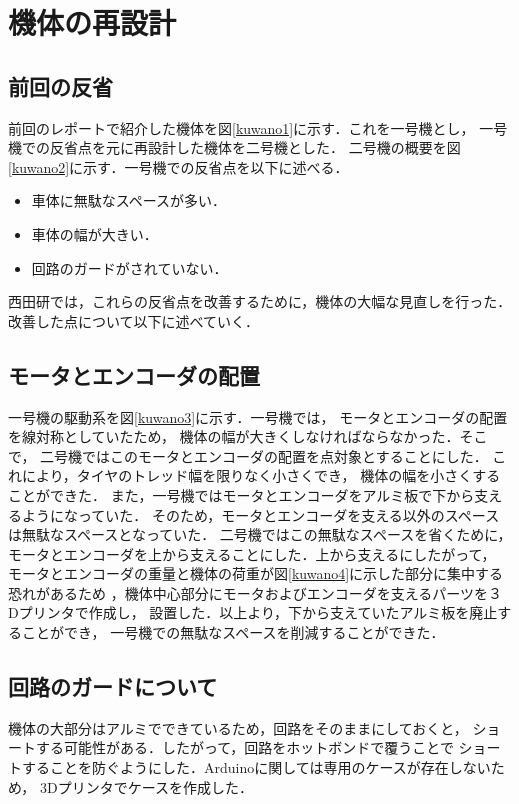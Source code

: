 \documentclass[11pt,a4j]{jarticle}
\begin{document}
\section{機体の再設計}
\subsection{前回の反省}
前回のレポートで紹介した機体を図\ref{kuwano1}に示す．これを一号機とし，
一号機での反省点を元に再設計した機体を二号機とした．
二号機の概要を図\ref{kuwano2}に示す．一号機での反省点を以下に述べる．

\begin{itemize}
 \item 車体に無駄なスペースが多い．
 \item 車体の幅が大きい．
 \item 回路のガードがされていない．
\end{itemize}

西田研では，これらの反省点を改善するために，機体の大幅な見直しを行った．
改善した点について以下に述べていく．

\subsection{モータとエンコーダの配置}
一号機の駆動系を図\ref{kuwano3}に示す．一号機では，
モータとエンコーダの配置を線対称としていたため，
機体の幅が大きくしなければならなかった．そこで，
二号機ではこのモータとエンコーダの配置を点対象とすることにした．
これにより，タイヤのトレッド幅を限りなく小さくでき，
機体の幅を小さくすることができた．
また，一号機ではモータとエンコーダをアルミ板で下から支えるようになっていた．
そのため，モータとエンコーダを支える以外のスペースは無駄なスペースとなっていた．
二号機ではこの無駄なスペースを省くために，
モータとエンコーダを上から支えることにした．上から支えるにしたがって，
モータとエンコーダの重量と機体の荷重が図\ref{kuwano4}に示した部分に集中する恐れがあるため
，機体中心部分にモータおよびエンコーダを支えるパーツを３Dプリンタで作成し，
設置した．以上より，下から支えていたアルミ板を廃止することができ，
一号機での無駄なスペースを削減することができた．

\subsection{回路のガードについて}
機体の大部分はアルミでできているため，回路をそのままにしておくと，
ショートする可能性がある．したがって，回路をホットボンドで覆うことで
ショートすることを防ぐようにした．Arduinoに関しては専用のケースが存在しないため，
3Dプリンタでケースを作成した．
\end{document}

